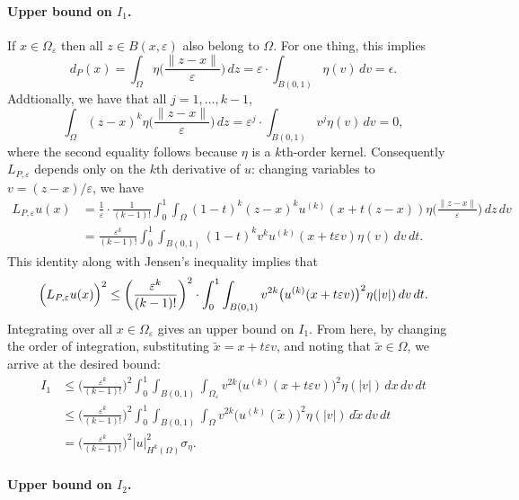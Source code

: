 \documentclass{article}
\newcommand{\1}{\mathbf{1}}
\newcommand{\wt}[1]{\widetilde{#1}}
\theoremstyle{definition}
\theoremstyle{remark}
\begin{document}
\paragraph{Upper bound on $I_1$.}
If $x \in \Omega_{\varepsilon}$ then all $z \in B(x,\varepsilon)$ also belong to $\Omega$. For one thing, this implies
\begin{equation*}
d_P(x) = \int_{\Omega} \eta\biggl(\frac{\|z - x\|}{\varepsilon}\biggr) \,dz = \varepsilon \cdot \int_{B(0,1)}  \eta(v) \,dv = \epsilon.
\end{equation*}
Addtionally, we have that all $j = 1,\ldots,k - 1$, 
\begin{equation*}
\int_{\Omega}(z - x)^{k}\eta\biggl(\frac{\|z - x\|}{\varepsilon}\biggr) \,dz = \varepsilon^j \cdot \int_{B(0,1)} v^j \eta(v) \,dv = 0,
\end{equation*}
where the second equality follows because $\eta$ is a $k$th-order kernel. Consequently $L_{P,\varepsilon}$ depends only on the $k$th derivative of $u$: changing variables to $v = (z - x)/\varepsilon$, we have
\begin{align*}
L_{P,\varepsilon}u(x) & = \frac{1}{\varepsilon} \cdot \frac{1}{(k - 1)!} \int_{0}^{1} \int_{\Omega} (1 - t)^k (z - x)^k u^{(k)}(x + t(z - x)) \eta\biggl(\frac{\|z - x\|}{\varepsilon}\biggr) \,dz \,dv \\
& = \frac{\varepsilon^{k}}{(k - 1)!} \int_{0}^{1} \int_{B(0,1)} (1 - t)^k v^k u^{(k)}(x + t\varepsilon v) \eta(v) \,dv \,dt.
\end{align*} 
This identity along with Jensen's inequality implies that
\begin{equation*}
\Bigl(L_{P,\varepsilon}u(x)\Bigr)^2 \leq \biggl(\frac{\varepsilon^{k}}{(k - 1)!}\biggr)^2 \cdot  \int_{0}^{1} \int_{B(0,1)} v^{2k} \bigl(u^{(k)}(x + t\varepsilon v)\bigr)^2 \eta(|v|) \,dv \,dt.
\end{equation*}
Integrating over all $x \in \Omega_{\varepsilon}$ gives an upper bound on $I_1$. 
From here, by changing the order of integration, substituting $\wt{x} = x + t\varepsilon v$, and noting that $\wt{x} \in \Omega$, we arrive at the desired bound:
\begin{align*}
I_1 & \leq \biggl(\frac{\varepsilon^{k}}{(k - 1)!}\biggr)^2 \int_{0}^{1} \int_{B(0,1)} \int_{\Omega_{\varepsilon}} v^{2k} \bigl(u^{(k)}(x + t\varepsilon v)\bigr)^2 \eta(|v|) \,dx \,dv \,dt \\
& \leq \biggl(\frac{\varepsilon^{k}}{(k - 1)!}\biggr)^2 \int_{0}^{1} \int_{B(0,1)} \int_{\Omega} v^{2k} \bigl(u^{(k)}(\wt{x})\bigr)^2 \eta(|v|) \,d\wt{x} \,dv \,dt \\
& = \biggl(\frac{\varepsilon^{k}}{(k - 1)!}\biggr)^2 |u|_{H^k(\Omega)}^2 \sigma_{\eta}.
\end{align*}

\paragraph{Upper bound on $I_2$.}
\end{document}
